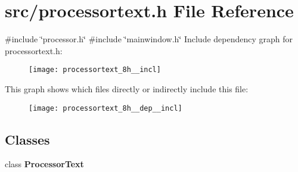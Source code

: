 \section{src/processortext.h File Reference}
\label{processortext_8h}
{\ttfamily \#include \char`\"{}processor.\+h\char`\"{}}\newline
{\ttfamily \#include \char`\"{}mainwindow.\+h\char`\"{}}\newline
Include dependency graph for processortext.\+h\+:\nopagebreak
\begin{figure}[H]
\begin{center}
\leavevmode
\texttt{[image: processortext\_8h\_\_incl]}
\end{center}
\end{figure}
This graph shows which files directly or indirectly include this file\+:\nopagebreak
\begin{figure}[H]
\begin{center}
\leavevmode
\texttt{[image: processortext\_8h\_\_dep\_\_incl]}
\end{center}
\end{figure}
\subsection*{Classes}
\begin{DoxyCompactItemize}
\item 
class \textbf{ Processor\+Text}
\end{DoxyCompactItemize}
